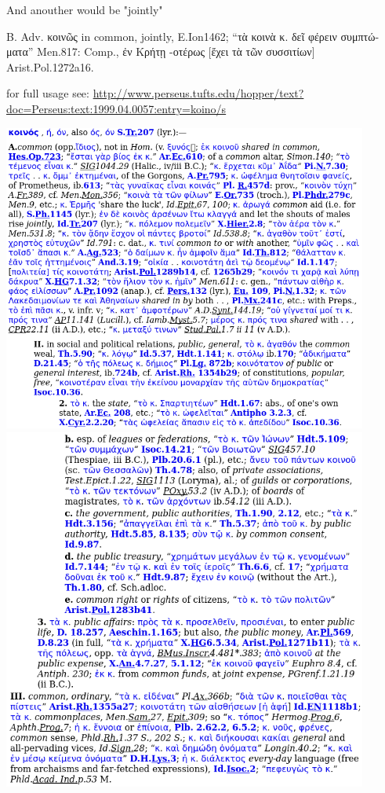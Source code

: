 \documentclass[11pt]{article}
\begin{document}
\begin{thebibliography}{37}
\begin{greek}
And anouther would be "jointly"

B. Adv. κοινῶς in common, jointly, E.Ion1462; “τὰ κοινὰ κ. δεῖ φέρειν συμπτώματα” Men.817: Comp., ἐν Κρήτῃ -οτέρως [ἔχει τὰ τῶν συσσιτίων] Arist.Pol.1272a16.

for full usage see:
\url{http://www.perseus.tufts.edu/hopper/text?doc=Perseus:text:1999.04.0057:entry=koino/s}
\end{greek}

\includegraphics[width=12cm]{koinos1}
\includegraphics[width=12cm]{koinos2}

\end{thebibliography}
\end{document}
